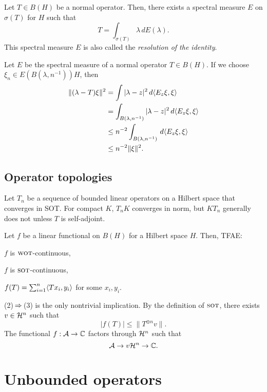 \documentclass{../../large}
\newcommand{\wot}{{\text{\sc wot}}}
\newcommand{\sot}{{\text{\sc sot}}}
\begin{document}
\begin{prb}
Let $T\in B(H)$ be a normal operator.
Then, there exists a spectral measure $E$ on $\sigma(T)$ for $H$ such that
\[T=\int_{\sigma(T)}\lambda\,dE(\lambda).\]
This spectral measure $E$ is also called the \emph{resolution of the identity}.
\end{prb}


Let $E$ be the spectral measure of a normal operator $T\in B(H)$.
If we choose $\xi_n\in E(B(\lambda,n^{-1}))H$, then
\begin{align*}
\|(\lambda-T)\xi\|^2
&=\int|\lambda-z|^2\,d\langle E_z\xi,\xi\rangle\\
&=\int_{B(\lambda,n^{-1})}|\lambda-z|^2\,d\langle E_z\xi,\xi\rangle\\
&\le n^{-2}\int_{B(\lambda,n^{-1})}\,d\langle E_z\xi,\xi\rangle\\
&\le n^{-2}\|\xi\|^2.
\end{align*}


\section{Operator topologies}


\begin{prb}
Let $T_n$ be a sequence of bounded linear operators on a Hilbert space that converges in SOT.
For compact $K$, $T_n K$ converges in norm, but $KT_n$ generally does not unless $T$ is self-adjoint.
\end{prb}

\begin{prb}
Let $f$ be a linear functional on $B(H)$ for a Hilbert space $H$.
Then, TFAE:
\begin{parts}
\item $f$ is $\wot$-continuous,
\item $f$ is $\sot$-continuous,
\item $f(T)=\sum_{i=1}^n\langle Tx_i,y_i\rangle$ for some $x_i,y_i$.
\end{parts}
\end{prb}
\begin{pf}
(2)$\impl$(3) is the only nontrivial implication.
By the definition of $\sot$, there exists $v\in \mathcal{H}^n$ such that
\[|f(T)|\le\|T^{\oplus n}v\|.\]
The functional $f:\mathcal{A}\to\mathbb{C}$ factors through $\mathcal{H}^n$ such that
\[\mathcal{A}\to{v}\mathcal{H}^n\to\mathbb{C}.\]
\end{pf}






\chapter{Unbounded operators}
\end{document}

